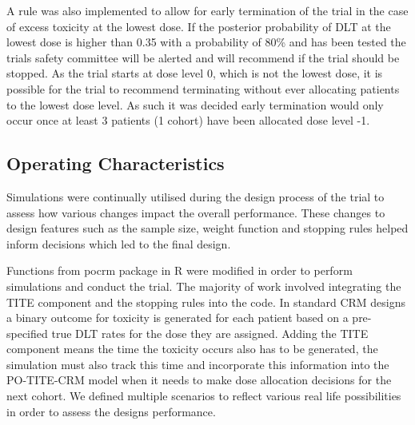 A rule was also implemented to allow for early termination of the trial in the case of excess toxicity at the lowest dose. If the posterior probability of DLT at the lowest dose is higher than 0.35 with a probability of 80\% and has been tested the trials safety committee will be alerted and will recommend if the trial should be stopped. As the trial starts at dose level 0, which is not the lowest dose, it is possible for the trial to recommend terminating without ever allocating patients to the lowest dose level. As such it was decided early termination would only occur once at least 3 patients (1 cohort) have been allocated dose level -1. 

\subsection{Operating Characteristics}
\label{section2.3.4}%

Simulations were continually utilised during the design process of the trial to assess how various changes impact the overall performance. These changes to design features such as the sample size, weight function and stopping rules helped inform decisions which led to the final design.  

Functions from pocrm package in R \cite{wagesPocrmRpackagePhase2013, wagesPocrmDoseFinding2019} were modified in order to perform simulations and conduct the trial. The majority of work involved integrating the TITE component and the stopping rules into the code. In standard CRM designs a binary outcome for toxicity is generated for each patient based on a pre-specified true DLT rates for the dose they are assigned. Adding the TITE component means the time the toxicity occurs also has to be generated, the simulation must also track this time and incorporate this information into the PO-TITE-CRM model when it needs to make dose allocation decisions for the next cohort. We defined multiple scenarios to reflect various real life possibilities in order to assess the designs performance.  

